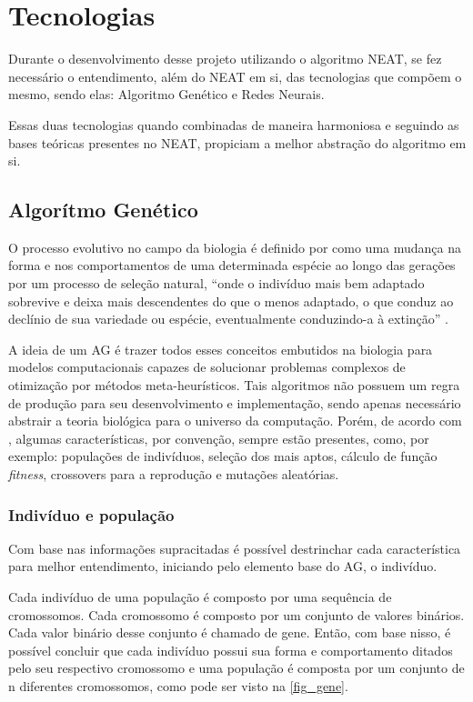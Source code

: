 \chapter{Tecnologias}

Durante o desenvolvimento desse projeto utilizando o algoritmo NEAT, se fez 
necessário o entendimento, além do NEAT em si, das tecnologias que compõem o 
mesmo, sendo elas: Algoritmo Genético e Redes Neurais. 

Essas duas tecnologias quando combinadas de maneira harmoniosa e 
seguindo as bases teóricas presentes no NEAT, propiciam a melhor abstração do 
algoritmo em si.

\section{Algor{\'i}tmo Gen{\'e}tico}

O processo evolutivo no campo da biologia é definido por
 como uma mudança na forma e
nos comportamentos de uma determinada espécie ao longo das
gerações por um processo de seleção natural, “onde o indivíduo
mais bem adaptado sobrevive e deixa mais descendentes do que o
menos adaptado, o que conduz ao declínio de sua variedade ou
espécie, eventualmente conduzindo-a à extinção”
\cite{do2009alfred}.

A ideia de um AG é trazer todos esses conceitos embutidos na
biologia para modelos computacionais capazes de solucionar
problemas complexos de otimização por métodos
meta-heurísticos. Tais algoritmos não possuem um regra de
produção para seu desenvolvimento e implementação, sendo
apenas necessário abstrair a teoria biológica para o universo
da computação. Porém, de acordo com
, algumas
características, por convenção, sempre estão presentes, como,
por exemplo: populações de indivíduos, seleção dos mais aptos,
cálculo de função \textit{fitness}, crossovers para a reprodução e
mutações aleatórias.

\subsection{Indiv{\'i}duo e popula{\c c}{\~a}o}

Com base nas informações supracitadas é possível destrinchar
cada característica para melhor entendimento, iniciando pelo
elemento base do AG, o indivíduo.

Cada indivíduo de uma população é composto por uma sequência
de cromossomos. Cada cromossomo é composto por um conjunto de
valores binários. Cada valor binário desse conjunto é chamado
de gene. Então, com base nisso, é possível concluir que cada
indivíduo possui sua forma e comportamento ditados pelo seu
respectivo cromossomo e uma população é composta por um
conjunto de n diferentes cromossomos, como pode ser visto na
\autoref{fig_gene}.

